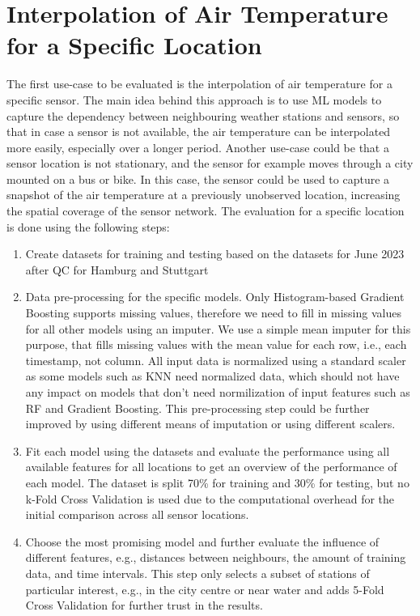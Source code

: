 \section{Interpolation of Air Temperature for a Specific Location}

The first use-case to be evaluated is the interpolation of air temperature for a specific sensor. The main idea behind this approach is to use ML models to capture the dependency between neighbouring weather stations and sensors, so that in case a sensor is not available, the air temperature can be interpolated more easily, especially over a longer period. Another use-case could be that a sensor location is not stationary, and the sensor for example moves through a city mounted on a bus or bike. In this case, the sensor could be used to capture a snapshot of the air temperature at a previously unobserved location, increasing the spatial coverage of the sensor network. The evaluation for a specific location is done using the following steps:

\begin{enumerate}
  \item Create datasets for training and testing based on the datasets for June 2023 after QC for Hamburg and Stuttgart
  \item Data pre-processing for the specific models. Only Histogram-based Gradient Boosting supports missing values, therefore we need to fill in missing values for all other models using an imputer. We use a simple mean imputer for this purpose, that fills missing values with the mean value for each row, i.e., each timestamp, not column. All input data is normalized using a standard scaler as some models such as KNN need normalized data, which should not have any impact on models that don't need normilization of input features such as RF and Gradient Boosting. This pre-processing step could be further improved by using different means of imputation or using different scalers.
  \item Fit each model using the datasets and evaluate the performance using all available features for all locations to get an overview of the performance of each model. The dataset is split 70\% for training and 30\% for testing, but no k-Fold Cross Validation is used due to the computational overhead for the initial comparison across all sensor locations.
  \item Choose the most promising model and further evaluate the influence of different features, e.g., distances between neighbours, the amount of training data, and time intervals. This step only selects a subset of stations of particular interest, e.g., in the city centre or near water and adds 5-Fold Cross Validation for further trust in the results.
\end{enumerate}

